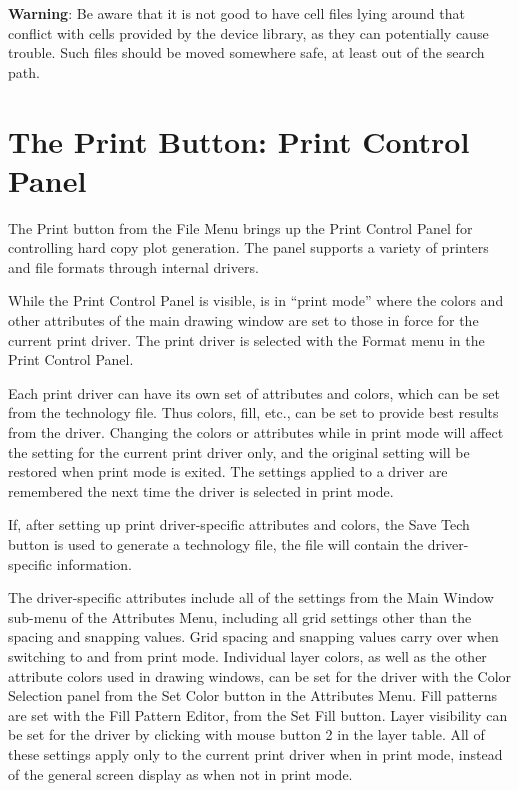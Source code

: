 {\bf Warning}:  Be aware that it is not good to have cell files lying
around that conflict with cells provided by the device library, as
they can potentially cause trouble.  Such files should be moved
somewhere safe, at least out of the search path.


\section{The {\cb Print} Button: Print Control Panel}

The {\cb Print} button from the {\cb File Menu} brings up the {\cb
Print Control Panel} for controlling hard copy plot generation.  The
panel supports a variety of printers and file formats through internal
drivers.

While the {\cb Print Control Panel} is visible, {\Xic} is in ``print
mode'' where the colors and other attributes of the main drawing
window are set to those in force for the current print driver.  The
print driver is selected with the {\cb Format} menu in the {\cb Print
Control Panel}.

Each print driver can have its own set of attributes and colors, which
can be set from the technology file.  Thus colors, fill, etc., can be
set to provide best results from the driver.  Changing the colors or
attributes while in print mode will affect the setting for the current
print driver only, and the original setting will be restored when
print mode is exited.  The settings applied to a driver are remembered
the next time the driver is selected in print mode.

If, after setting up print driver-specific attributes and colors, the
{\cb Save Tech} button is used to generate a technology file, the file
will contain the driver-specific information.

The driver-specific attributes include all of the settings from the
{\cb Main Window} sub-menu of the {\cb Attributes Menu}, including all
grid settings other than the spacing and snapping values.  Grid
spacing and snapping values carry over when switching to and from
print mode.  Individual layer colors, as well as the other attribute
colors used in drawing windows, can be set for the driver with the
{\cb Color Selection} panel from the {\cb Set Color} button in the
{\cb Attributes Menu}.  Fill patterns are set with the {\cb Fill
Pattern Editor}, from the {\cb Set Fill} button.  Layer visibility can
be set for the driver by clicking with mouse button 2 in the layer
table.  All of these settings apply only to the current print driver
when in print mode, instead of the general screen display as when not
in print mode.

